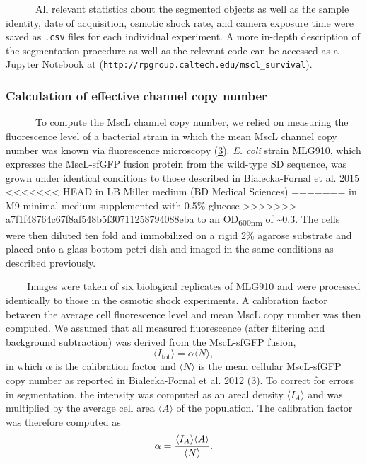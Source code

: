 ~ ~ ~
~All
relevant
statistics
about
the
segmented
objects
as
well
as the
sample
identity,
date
of
acquisition,
osmotic
shock
rate,
and
camera
exposure
time
were
saved
as
\texttt{.csv}
files
for
each
individual
experiment.
A more
in-depth
description
of the
segmentation
procedure
as
well
as the
relevant
code
can be
accessed
as a
Jupyter
Notebook
at
(\texttt{http://rpgroup.caltech.edu/mscl\_survival}).

\subsubsection{Calculation
of
effective
channel
copy
number}\label{calculation-of-effective-channel-copy-number}

~ ~ ~
~To
compute
the
MscL
channel
copy
number,
we
relied
on
measuring
the
fluorescence
level
of a
bacterial
strain
in
which
the
mean
MscL
channel
copy
number
was
known
via
fluorescence
microscopy
(\protect\hyperlink{ref-bialecka-fornal2012}{3}).
\emph{E.
coli}
strain
MLG910,
which
expresses
the
MscL-sfGFP
fusion
protein
from
the
wild-type
SD
sequence,
was
grown
under
identical
conditions
to
those
described
in
Bialecka-Fornal
et al.
2015
<<<<<<< HEAD
in LB
Miller
medium
(BD
Medical
Sciences)
=======
in M9
minimal
medium
supplemented
with
0.5\%
glucose
>>>>>>> a7f1f48764c67f8af548b5f30711258794088eba
to an
OD\textsubscript{600nm}
of
\textasciitilde{}0.3.
The
cells
were
then
diluted
ten
fold
and
immobilized
on a
rigid
2\%
agarose
substrate
and
placed
onto a
glass
bottom
petri
dish
and
imaged
in the
same
conditions
as
described
previously.

~ ~
~Images
were
taken
of six
biological
replicates
of
MLG910
and
were
processed
identically
to
those
in the
osmotic
shock
experiments.
A
calibration
factor
between
the
average
cell
fluorescence
level
and
mean
MscL
copy
number
was
then
computed.
We
assumed
that
all
measured
fluorescence
(after
filtering
and
background
subtraction)
was
derived
from
the
MscL-sfGFP
fusion,
\begin{equation}
\langle I_\text{tot}\rangle = \alpha \langle N \rangle,
\label{eq:ian}\end{equation}
in
which
\(\alpha\)
is the
calibration
factor
and
\(\langle N \rangle\)
is the
mean
cellular
MscL-sfGFP
copy
number
as
reported
in
Bialecka-Fornal
et al.
2012
(\protect\hyperlink{ref-bialecka-fornal2012}{3}).
To
correct
for
errors
in
segmentation,
the
intensity
was
computed
as an
areal
density
\(\langle I_A \rangle\)
and
was
multiplied
by the
average
cell
area
\(\langle A \rangle\)
of the
population.
The
calibration
factor
was
therefore
computed
as
\begin{equation}
\alpha = {\langle I_A \rangle \langle A \rangle \over \langle N \rangle}.
\label{eq:calibration_factor}\end{equation}

